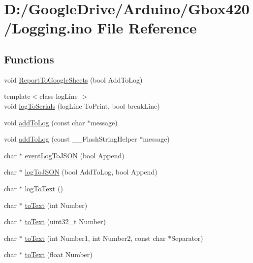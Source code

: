\hypertarget{_logging_8ino}{}\section{D\+:/\+Google\+Drive/\+Arduino/\+Gbox420/\+Logging.ino File Reference}
\label{_logging_8ino}
\subsection*{Functions}
\begin{DoxyCompactItemize}
\item 
void \mbox{\hyperlink{_logging_8ino_ad1bb4c1aefdc19ace1f33fd1d8121a4e}{Report\+To\+Google\+Sheets}} (bool Add\+To\+Log)
\item 
{\footnotesize template$<$class log\+Line $>$ }\\void \mbox{\hyperlink{_logging_8ino_ae322bfa37a28b422a3bf210b592ce53d}{log\+To\+Serials}} (log\+Line To\+Print, bool break\+Line)
\item 
void \mbox{\hyperlink{_logging_8ino_adeabc8820c47e5de835e1b54cc277645}{add\+To\+Log}} (const char $\ast$message)
\item 
void \mbox{\hyperlink{_logging_8ino_a7c96ea1fcfbe516b7019d1772b4cdfab}{add\+To\+Log}} (const \+\_\+\+\_\+\+Flash\+String\+Helper $\ast$message)
\item 
char $\ast$ \mbox{\hyperlink{_logging_8ino_a01701395f5a098fac02e9e0161757e38}{event\+Log\+To\+J\+S\+ON}} (bool Append)
\item 
char $\ast$ \mbox{\hyperlink{_logging_8ino_a3b4deca2ab77732f207bc569e4d8e45b}{log\+To\+J\+S\+ON}} (bool Add\+To\+Log, bool Append)
\item 
char $\ast$ \mbox{\hyperlink{_logging_8ino_ab89ffa5b586c2c00bd945abc537249bb}{log\+To\+Text}} ()
\item 
char $\ast$ \mbox{\hyperlink{_logging_8ino_a86298138ea32297a21623d770d6674b8}{to\+Text}} (int Number)
\item 
char $\ast$ \mbox{\hyperlink{_logging_8ino_a7cf8a6b4aab3b6b87c07d212a2d7c471}{to\+Text}} (uint32\+\_\+t Number)
\item 
char $\ast$ \mbox{\hyperlink{_logging_8ino_a8f2a6e8caac4689efede55386745032c}{to\+Text}} (int Number1, int Number2, const char $\ast$Separator)
\item 
char $\ast$ \mbox{\hyperlink{_logging_8ino_a4b9899272299200c8b76136aa999a5b1}{to\+Text}} (float Number)
\item 

\end{DoxyCompactItemize}
